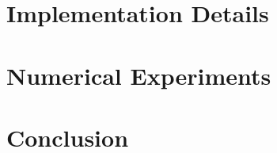 \documentclass[3p, 11pt]{elsarticle}
\begin{document}
\section{Implementation Details}\label{section:implementation}


\section{Numerical Experiments}\label{section:numerical}


\section{Conclusion}\label{section:conclusion}


\clearpage
	
	
\end{document}
